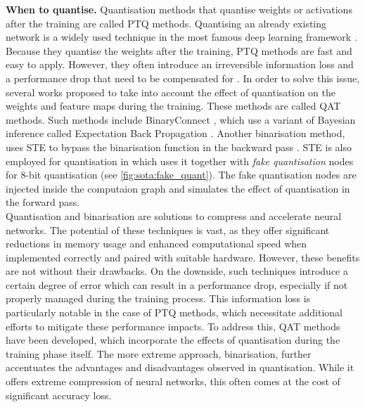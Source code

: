 \noindent\textbf{When to quantise.} Quantisation methods that quantise weights
or activations after the training are called \ac{PTQ} methods. Quantising an
already existing network is a widely used technique in the most famous deep
learning framework \cite{ncnn,qnnpack,snapdragon,tensorrt}. Because they
quantise the weights after the training, \ac{PTQ} methods are fast and easy to
apply. However, they often introduce an irreversible information loss and  a
performance drop that need to be compensated for
\cite{DBLP:journals/ijon/LiangGWSZ21}. In order to solve this issue, several
works proposed to take into account the effect of quantisation on the weights
and feature maps during the training. These methods are called \ac{QAT} methods.
Such methods include BinaryConnect \cite{courbariaux2015binaryconnect}, which
use a variant of Bayesian inference called Expectation Back Propagation
\cite{DBLP:journals/corr/ChengSML15,DBLP:conf/nips/SoudryHM14}. Another
binarisation method, uses \ac{STE} \cite{DBLP:journals/corr/BengioLC13} to
bypass the binarisation function in the backward pass
\cite{DBLP:conf/nips/HubaraCSEB16}. \ac{STE} is also employed for quantisation
in \cite{DBLP:conf/cvpr/JacobKCZTHAK18} which uses it together with \emph{fake
  quantisation} nodes for 8-bit quantisation (see \cref{fig:sota:fake_quant}). The
fake quantisation nodes are injected inside the computaion graph and simulates
the effect of quantisation in the forward pass.\\

Quantisation and binarisation are solutions to compress and accelerate neural
networks. The potential of these techniques is vast, as they offer significant
reductions in memory usage and enhanced computational speed when implemented
correctly and paired with suitable hardware. However, these benefits are not
without their drawbacks. On the downside, such techniques introduce a certain
degree of error which can result in a performance drop, especially if not
properly managed during the training process. This information loss is
particularly notable in the case of \acl{PTQ} methods, which necessitate
additional efforts to mitigate these performance impacts. To address this,
\ac{QAT} methods have been developed, which incorporate the effects of
quantisation during the training phase itself. The more extreme approach,
binarisation, further accentuates the advantages and disadvantages observed in
quantisation. While it offers extreme compression of neural networks, this often
comes at the cost of significant accuracy loss.\\


